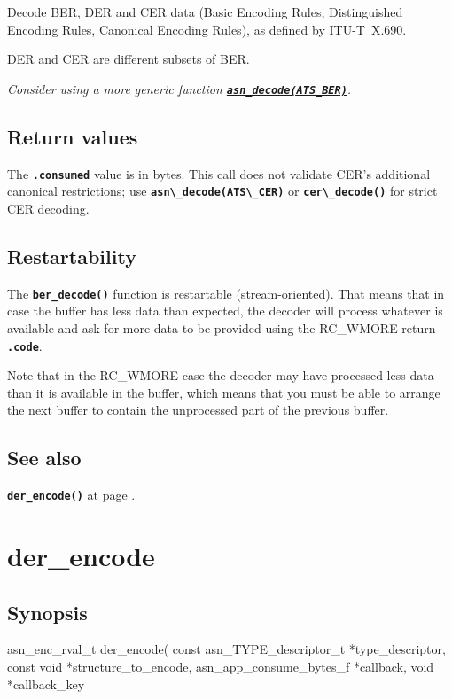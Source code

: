 \documentclass[english,oneside,12pt]{book}
\newcommand{\apisection}[2]{\clearpage\section{\label{#1}#2}}
\newcommand{\api}[2]{\hyperref[#1]{\code{#2}}}
\newcommand{\seealso}[2]{\api{#1}{#2} at page \pageref{#1}}
\newcommand{\code}[1]{\texttt{\textbf{\lstinline{#1}}}}
\begin{document}
Decode BER, DER and CER data
(Basic Encoding Rules, Distinguished Encoding Rules, Canonical Encoding Rules),
as defined by ITU-T~X.690.

DER and CER are different subsets of BER.\newline

\noindent\emph{Consider using a more generic function \api{sec:asn_decode}{asn_decode(ATS_BER)}.}

\subsection*{Return values}


The \code{.consumed} value is in bytes. This call does not validate CER's
additional canonical restrictions; use \code{asn\_decode(ATS\_CER)} or
\code{cer\_decode()} for strict CER decoding.

\subsection*{Restartability}

The \code{ber_decode()} function is restartable (stream-oriented).
That means that in case the buffer has less data than expected,
the decoder will process whatever is available and ask for more data
to be provided using the RC\_WMORE return \code{.code}.

Note that in the RC\_WMORE case the decoder may have processed less data than
it is available in the buffer, which means that you must be able to arrange
the next buffer to contain the unprocessed part of the previous buffer.

\subsection*{See also}
\seealso{sec:der_encode}{der_encode()}.

\apisection{sec:der_encode}{der\_encode}

\subsection*{Synopsis}

\begin{signature}
asn_enc_rval_t der_encode(
    const asn_TYPE_descriptor_t *type_descriptor,
    const void *structure_to_encode,
    asn_app_consume_bytes_f *callback,
    void *callback_key
\end{signature}
\end{document}
